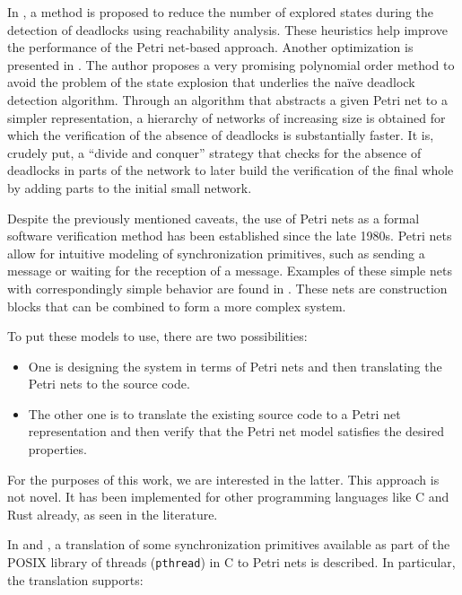\documentclass[../Thesis.tex]{subfiles}
\begin{document}
In \cite{karatkevich2014deadlock}, a method is proposed
to reduce the number of explored states
during the detection of deadlocks using reachability analysis.
These heuristics help improve the performance of the Petri net-based approach.
Another optimization is presented in \cite{kungas2005petri}.
The author proposes a very promising polynomial order method to avoid the problem
of the state explosion that underlies the naïve deadlock detection algorithm.
Through an algorithm that abstracts a given Petri net to a simpler representation,
a hierarchy of networks of increasing size is obtained
for which the verification of the absence of deadlocks is substantially faster.
It is, crudely put, a ``divide and conquer'' strategy
that checks for the absence of deadlocks in parts of the network
to later build the verification of the final whole
by adding parts to the initial small network.

Despite the previously mentioned caveats,
the use of Petri nets as a formal software verification method
has been established since the late 1980s.
Petri nets allow for intuitive modeling of synchronization primitives,
such as sending a message or waiting for the reception of a message.
Examples of these simple nets with correspondingly simple behavior
are found in \cite{heiner1992petri}.
These nets are construction blocks that can be combined to form a more complex system.

To put these models to use, there are two possibilities:

\begin{itemize}
      \item One is designing the system in terms of Petri nets
            and then translating the Petri nets to the source code.
      \item The other one is to translate the existing source code to a Petri net representation
            and then verify that the Petri net model satisfies the desired properties.
\end{itemize}

For the purposes of this work, we are interested in the latter.
This approach is not novel.
It has been implemented for other programming languages like C and Rust already,
as seen in the literature.

In \cite{kavi2002modeling} and \cite{moshtaghi2001},
a translation of some synchronization primitives available as part of
the POSIX library of threads (\texttt{pthread}) in C to Petri nets is described.
In particular, the translation supports:
\end{document}
